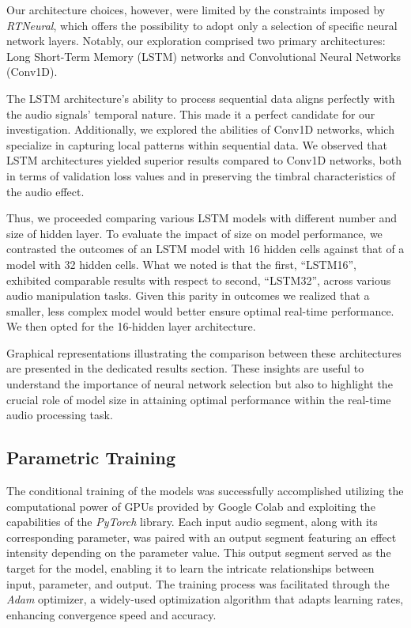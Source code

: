 \documentclass{article}
\newcommand{\quotes}[1]{``#1''}
\begin{document}
\begin{sloppy}
Our architecture choices, however, were limited by the constraints imposed by \emph{RTNeural}, which offers the possibility to adopt only a selection of specific neural network layers. Notably, our exploration comprised two primary architectures: Long Short-Term Memory (LSTM) networks and Convolutional Neural Networks (Conv1D).

The LSTM architecture's ability to process sequential data aligns perfectly with the audio signals' temporal nature. This made it a perfect candidate for our investigation. Additionally, we explored the abilities of Conv1D networks, which specialize in capturing local patterns within sequential data. We observed that LSTM architectures yielded superior results compared to Conv1D networks, both in terms of validation loss values and in preserving the timbral characteristics of the audio effect.

Thus, we proceeded comparing various LSTM models with different number and size of hidden layer. To evaluate the impact of size on model performance, we contrasted the outcomes of an LSTM model with 16 hidden cells against that of a model with 32 hidden cells. What we noted is that the first, \quotes{LSTM16}, exhibited comparable results with respect to second, \quotes{LSTM32}, across various audio manipulation tasks. Given this parity in outcomes we realized that a smaller, less complex model would better ensure optimal real-time performance. We then opted for the 16-hidden layer architecture. 

Graphical representations illustrating the comparison between these architectures are presented in the dedicated results section. These insights are useful to understand the importance of neural network selection but also to highlight the crucial role of model size in attaining optimal performance within the real-time audio processing task.

\subsection{Parametric Training}
\label{ssec:parTraining}
The conditional training of the models was successfully accomplished utilizing the computational power of GPUs provided by Google Colab and exploiting the capabilities of the \emph{PyTorch} library. Each input audio segment, along with its corresponding parameter, was paired with an output segment featuring an effect intensity depending on the parameter value. This output segment served as the target for the model, enabling it to learn the intricate relationships between input, parameter, and output. The training process was facilitated through the \emph{Adam} optimizer, a widely-used optimization algorithm that adapts learning rates, enhancing convergence speed and accuracy.


\end{sloppy}
\end{document}
